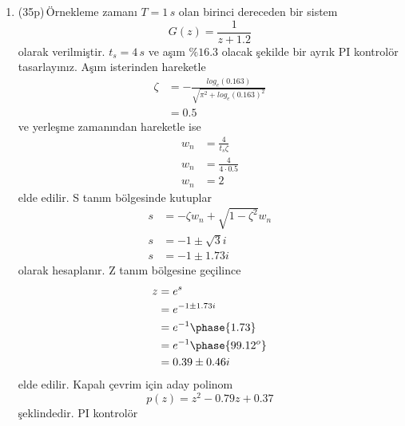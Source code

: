 \begin{enumerate}[\bfseries S1.]
    \item (35p)\,Örnekleme zamanı $T=1\,s$ olan birinci dereceden bir sistem 
    \begin{equation}
        G(z)=\frac{1}{z+1.2}
    \end{equation}
    olarak verilmiştir. $t_s=4\,s$ ve aşım $\%16.3$ olacak şekilde bir ayrık PI kontrolör tasarlayınız. Aşım isterinden hareketle
    \begin{equation}
    \begin{split}
        \zeta&=-\frac{log_e(0.163)}{\sqrt{\pi^2+log_e(0.163)^2}}\\
        &=0.5
    \end{split}
    \end{equation}
    ve yerleşme zamanından hareketle ise 
    \begin{equation}
        \begin{split}
            w_n&=\frac{4}{t_s\zeta}\\
            w_n&=\frac{4}{4\cdot 0.5}\\
            w_n&=2
        \end{split}
    \end{equation}
    elde edilir. S tanım bölgesinde kutuplar
    \begin{equation}
    \begin{split}
        s&=-\zeta w_n+\sqrt{1-\zeta^2}w_n\\
        s&=-1\pm \sqrt{3}i\\
        s&=-1\pm 1.73i
    \end{split}
    \end{equation}
    olarak hesaplanır. Z tanım bölgesine geçilince
    \begin{equation}
        \begin{split}
            z&=e^{s}\\
            &=e^{-1\pm 1.73i}\\
            &=e^{-1}\phase{1.73}\\
            &=e^{-1}\phase{99.12^o}\\
            &=0.39\pm0.46i
        \end{split}
    \end{equation}
    elde edilir. Kapalı çevrim için aday polinom
    \begin{equation}
        p(z)=z^2-0.79z+0.37
    \end{equation}
    şeklindedir. PI kontrolör
    \begin{equation}

\end{equation}
\end{enumerate}

